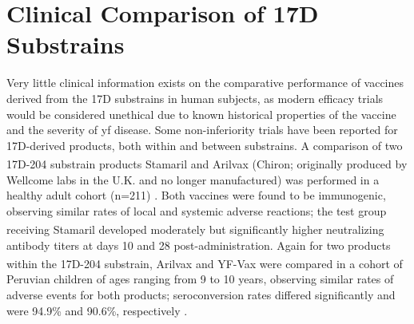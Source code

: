 \section{Clinical Comparison of 17D Substrains}
Very little clinical information exists on the comparative performance of vaccines derived from the 17D substrains in human subjects, as modern efficacy trials would be considered unethical due to known historical properties of the vaccine and the severity of \gls{yf} disease. Some non-inferiority trials have been reported for 17D-derived products, both within and between substrains. A comparison of two 17D-204 substrain products Stamaril\textsuperscript{\textregistered} and Arilvax\textsuperscript{\textregistered} (Chiron; originally produced by Wellcome labs in the U.K. and no longer manufactured) was performed in a healthy adult cohort (n=211) \parencite{Lang:1999wi}. Both vaccines were found to be immunogenic, observing similar rates of local and systemic adverse reactions; the test group receiving Stamaril\textsuperscript{\textregistered} developed moderately but significantly higher neutralizing antibody titers at days 10 and 28 post-administration. Again for two products within the 17D-204 substrain, Arilvax\textsuperscript{\textregistered} and YF-Vax\textsuperscript{\textregistered} were compared in a cohort of Peruvian children of ages ranging from 9 to 10 years, observing similar rates of adverse events for both products; seroconversion rates differed significantly and were 94.9\% and 90.6\%, respectively \parencite{BelmustoWorn:2005tt}.  

